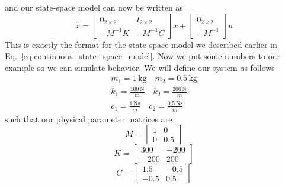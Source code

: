 and our state-space model can now be written as
\begin{equation}
    \dot{x}=
    \begin{bmatrix}
        0_{2\times 2} & I_{2\times 2} \\
        -M^{-1}K & -M^{-1}C
    \end{bmatrix}
    x+
    \begin{bmatrix}
        0_{2\times 2} \\ -M^{-1}
    \end{bmatrix}
    u
    \label{eq:spring_mass_state_space_continuous_compact}
\end{equation}
This is exactly the format for the state-space model we described earlier in Eq.~\ref{eq:continuous_state_space_model}.
Now we put some numbers to our example so we can simulate behavior. We will define our system as follows
\begin{align}
    m_1 = 1\, \text{kg} \quad m_2 = 0.5\, \text{kg} \\
    k_1 = \frac{100\,\text{N}}{\text{m}} \quad k_2 = \frac{200\,\text{N}}{m} \\
    c_1 = \frac{1\,\text{Ns}}{m} \quad c_2 = \frac{0.5\,\text{Ns}}{m}
\end{align}
such that our physical parameter matrices are
\begin{equation}
    M = 
    \begin{bmatrix}
        1 & 0 \\
        0 & 0.5
    \end{bmatrix}
    \label{eq:mass_matrix_real}
\end{equation}
\begin{equation}
    K =
    \begin{bmatrix}
        300 & -200 \\
        -200 & 200
    \end{bmatrix}
    \label{eq:stiffness_matrix_real}
\end{equation}
\begin{equation}
    C = 
    \begin{bmatrix}
        1.5 & -0.5 \\
        -0.5 & 0.5
    \end{bmatrix}
    \label{eq:dampning_matrix_real}
\end{equation}

